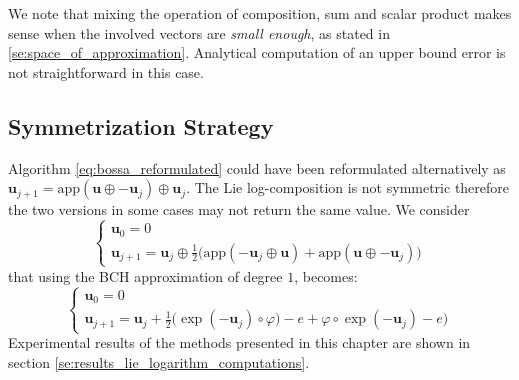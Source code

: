 We note that mixing the operation of composition, sum and scalar product makes sense when the involved vectors are \emph{small enough}, as stated in \ref{se:space_of_approximation}. 
Analytical computation of an upper bound error is not straightforward in this case. 

% 
\subsection{Symmetrization Strategy}
Algorithm \ref{eq:bossa_reformulated} could have been reformulated alternatively as $\mathbf{u}_{j+1} =    \text{app}(\mathbf{u} \oplus  - \mathbf{u}_{j}  ) \oplus \mathbf{u}_{j}$. The Lie log-composition is not symmetric therefore the two versions in some cases may not return the same value. We consider
\begin{equation}\label{eq:bossa_symmetric}
\begin{cases}
\mathbf{u}_0 = 0 \\
\mathbf{u}_{j+1} = \mathbf{u}_{j} \oplus 
\frac{1}{2}
\big(  
\text{app}(-\mathbf{u}_{j}  \oplus  \mathbf{u} )
+
\text{app}(\mathbf{u} \oplus  - \mathbf{u}_{j}  )
\big)
\end{cases}
\end{equation}
that using the BCH approximation of degree $1$, becomes:
\begin{equation}
\begin{cases}
\mathbf{u}_0 = 0 \\
\mathbf{u}_{j+1} 
=
\mathbf{u}_{j} +  
\frac{1}{2}
\big(  
\exp(-\mathbf{u}_{j}) \circ \varphi ) - e
+
\varphi\circ\exp(-\mathbf{u}_{j}) - e
\big)
\end{cases}
\end{equation}
Experimental results of the methods presented in this chapter are shown in section \ref{se:results_lie_logarithm_computations}.
